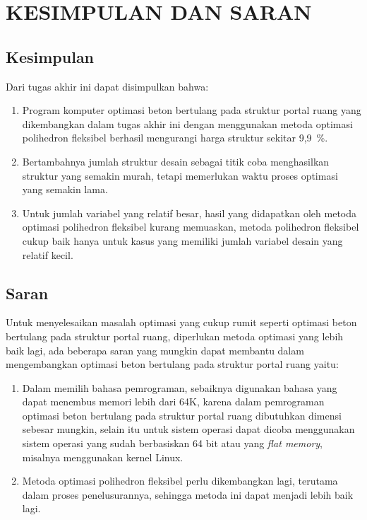 \chapter{KESIMPULAN DAN SARAN}
\label{bab:kesimpulan}

\section{Kesimpulan}

Dari tugas akhir ini dapat disimpulkan bahwa:
\begin{enumerate}[label=\arabic*.]
\item Program komputer optimasi beton bertulang pada struktur portal
      ruang yang dikembangkan dalam tugas akhir ini dengan menggunakan
      metoda optimasi polihedron fleksibel berhasil mengurangi harga
      struktur sekitar 9,9~\%.
\item Bertambahnya jumlah struktur desain sebagai titik coba
      menghasilkan struktur yang semakin murah, tetapi memerlukan waktu
      proses optimasi yang semakin lama.
\item Untuk jumlah variabel yang relatif besar, hasil yang didapatkan
      oleh metoda optimasi polihedron fleksibel kurang memuaskan, metoda
      polihedron fleksibel cukup baik hanya untuk kasus yang memiliki
      jumlah variabel desain yang relatif kecil.
\end{enumerate}

\section{Saran}

Untuk menyelesaikan masalah optimasi yang cukup rumit seperti optimasi
beton bertulang pada struktur portal ruang, diperlukan metoda optimasi
yang lebih baik lagi, ada beberapa saran yang mungkin dapat membantu
dalam mengembangkan optimasi beton bertulang pada struktur portal ruang
yaitu:
\begin{enumerate}[label=\arabic*.]
\item Dalam memilih bahasa pemrograman, sebaiknya digunakan bahasa yang
      dapat menembus memori lebih dari 64K, karena dalam pemrograman
      optimasi beton bertulang pada struktur portal ruang dibutuhkan
      dimensi sebesar mungkin, selain itu untuk sistem operasi dapat
      dicoba menggunakan sistem operasi yang sudah berbasiskan 64 bit
      atau yang \textit{flat memory}, misalnya menggunakan kernel Linux.
\item Metoda optimasi polihedron fleksibel perlu dikembangkan lagi,
      terutama dalam proses penelusurannya, sehingga metoda ini dapat
      menjadi lebih baik lagi.
\end{enumerate}
